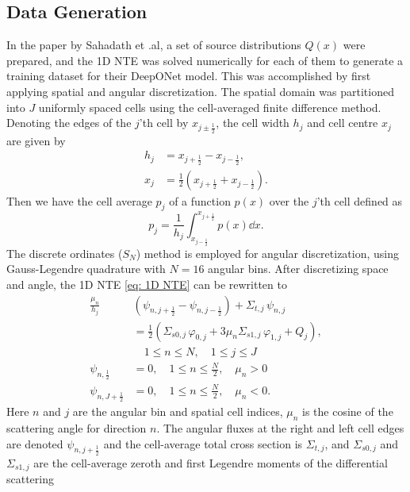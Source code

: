 \documentclass[%
 reprint,
 amsmath,amssymb,
 aps,
]{revtex4-1}
\begin{document}
\subsection{Data Generation}

In the paper by Sahadath et .al, a set of source distributions $Q(x)$ were prepared, and the 1D NTE was solved numerically for each of them to
generate a training dataset for their DeepONet model. This was accomplished by first applying spatial and angular discretization. The spatial domain
was partitioned into $J$ uniformly spaced cells using the cell-averaged finite difference method. Denoting the edges of the $j$'th cell by
$x_{j\pm\frac{1}{2}}$, the cell width $h_j$ and cell centre $x_j$ are given by
\begin{align}
    h_j &= x_{j+\frac{1}{2}} - x_{j-\frac{1}{2}}, \\
    x_j &= \frac{1}{2}\left(x_{j+\frac{1}{2}} + x_{j-\frac{1}{2}} \right).
\end{align}
Then we have the cell average $p_j$ of a function $p(x)$ over the $j$'th cell defined as
\begin{equation}
    p_j = \frac{1}{h_j} \int_{x_{j-\frac{1}{2}}}^{x_{j+\frac{1}{2}}} p(x) \dd x.
\end{equation}
The discrete ordinates ($S_N$) method is employed for angular discretization, using Gauss-Legendre quadrature with $N = 16$ angular bins. After
discretizing space and angle, the 1D NTE \eqref{eq: 1D NTE} can be rewritten to
\begin{align}
\frac{\mu_n}{h_j} &\left( \psi_{n, j+\frac{1}{2}} - \psi_{n, j-\frac{1}{2}} \right)
+ \Sigma_{t,j} \, \psi_{n,j} \nonumber \\
&= \frac{1}{2} \left( \Sigma_{s0,j} \, \varphi_{0,j} + 3 \mu_n \Sigma_{s1,j} \, \varphi_{1,j} + Q_j \right), \nonumber \\
& \quad 1 \leq n \leq N, \quad 1 \leq j \leq J \nonumber \\
\psi_{n, \frac{1}{2}} &= 0, \quad 1 \leq n \leq \tfrac{N}{2}, \quad \mu_n > 0 \nonumber \\
\psi_{n, J+\frac{1}{2}} &= 0, \quad 1 \leq n \leq \tfrac{N}{2}, \quad \mu_n < 0. \label{eq: Discretized NTE}
\end{align}
Here $n$ and $j$ are the angular bin and spatial cell indices, $\mu_n$ is the cosine of the scattering angle for direction
$n$. The angular fluxes at the right and left cell edges are denoted $\psi_{n, j+\frac{1}{2}}$ and the cell-average total cross section is
$\Sigma_{t,j}$, and $\Sigma_{s0,j}$ and $\Sigma_{s1,j}$ are the cell-average zeroth and first Legendre moments of the differential scattering
\end{document}

